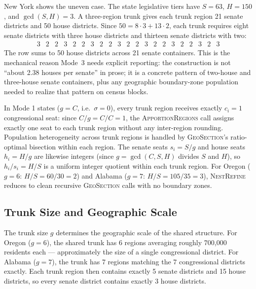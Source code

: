 New York shows the uneven case.  The state legislative tiers have
$S=63$, $H=150$, and $\gcd(S,H)=3$.  A three-region trunk gives each trunk
region 21 senate districts and 50 house districts.  Since
$50 = 8\cdot 3 + 13\cdot 2$, each trunk requires eight senate districts with
three house districts and thirteen senate districts with two:
\[
\begin{array}{ccccccccccccccccccccc}
3&2&2&3&2&2&3&2&2&3&2&2&3&2&2&3&2&2&3&2&3
\end{array}
\]
The row sums to 50 house districts across 21 senate containers.  This is the
mechanical reason Mode~3 needs explicit reporting: the construction is not
``about 2.38 houses per senate'' in prose; it is a concrete pattern of
two-house and three-house senate containers, plus any geographic boundary-zone
population needed to realize that pattern on census blocks.

\begin{remark}
\label{rem:mode1-uniformity}
In Mode 1 states ($g = C$, i.e.\ $\sigma = 0$), every trunk region receives
exactly $c_i = 1$ congressional seat: since $C/g = C/C = 1$, the
\textsc{ApportionRegions} call assigns exactly one seat to each trunk region
without any inter-region rounding.
Population heterogeneity across trunk regions is handled by
\textsc{GeoSection}'s ratio-optimal bisection within each region.
The senate seats $s_i = S/g$ and house seats $h_i = H/g$ are likewise
integers (since $g = \gcd(C,S,H)$ divides $S$ and $H$), so
$h_i/s_i = H/S$ is a uniform integer quotient within each trunk region.
For Oregon ($g=6$: $H/S = 60/30 = 2$) and Alabama ($g=7$: $H/S = 105/35 = 3$),
\textsc{NestRefine} reduces to clean recursive \textsc{GeoSection} calls
with no boundary zones.
\end{remark}

\subsection{Trunk Size and Geographic Scale}

The trunk size $g$ determines the geographic scale of the shared structure.
For Oregon ($g = 6$), the shared trunk has 6 regions averaging roughly 700,000
residents each --- approximately the size of a single congressional district.
For Alabama ($g = 7$), the trunk has 7 regions matching the 7 congressional
districts exactly.  Each trunk region then contains exactly 5 senate districts
and 15 house districts, so every senate district contains exactly 3 house
districts.

